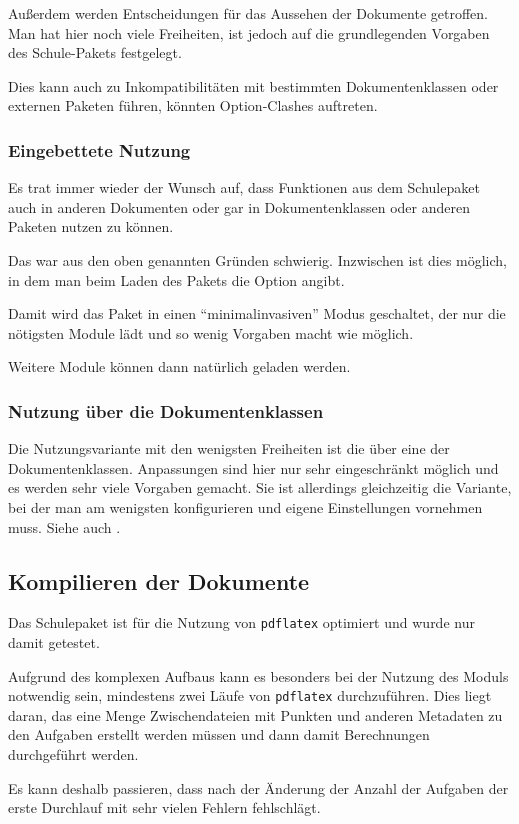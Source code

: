 		Außerdem werden Entscheidungen für das Aussehen der Dokumente
		getroffen. Man hat hier noch viele Freiheiten, ist jedoch auf
		die grundlegenden Vorgaben des Schule-Pakets festgelegt.

		Dies kann auch zu Inkompatibilitäten mit bestimmten
		Dokumentenklassen oder externen Paketen führen, \zB\space
		könnten Option-Clashes auftreten.

	\subsubsection{Eingebettete Nutzung}
		Es trat immer wieder der Wunsch auf, dass Funktionen aus dem
		Schulepaket auch in anderen Dokumenten oder gar in
		Dokumentenklassen oder anderen Paketen nutzen zu können.

		Das war aus den oben genannten Gründen schwierig. Inzwischen
		ist dies möglich, in dem man beim Laden des Pakets die Option
		 angibt.

		Damit wird das Paket in einen \enquote{minimalinvasiven} Modus
		geschaltet, der nur die nötigsten Module lädt und so wenig
		Vorgaben macht wie möglich.

		Weitere Module können dann natürlich geladen werden.

	\subsubsection{Nutzung über die Dokumentenklassen}
		Die Nutzungsvariante mit den wenigsten Freiheiten ist die
		über eine der Dokumentenklassen. Anpassungen sind hier nur
		sehr eingeschränkt möglich und es werden sehr viele Vorgaben
		gemacht. Sie ist allerdings gleichzeitig die Variante, bei
		der man am wenigsten konfigurieren und eigene Einstellungen
		vornehmen muss. Siehe auch .

\subsection{Kompilieren der Dokumente}
	Das Schulepaket ist für die Nutzung von \texttt{pdflatex}
	optimiert und wurde nur damit getestet.

	Aufgrund des komplexen Aufbaus kann es besonders bei der Nutzung
	des Moduls  notwendig sein, mindestens zwei
	Läufe von \texttt{pdflatex} durchzuführen. Dies liegt daran, das
	eine Menge Zwischendateien mit Punkten und anderen Metadaten zu
	den Aufgaben erstellt werden müssen und dann damit Berechnungen
	durchgeführt werden.

	Es kann deshalb passieren, dass nach der Änderung der Anzahl der
	Aufgaben der erste Durchlauf mit sehr vielen Fehlern fehlschlägt.
